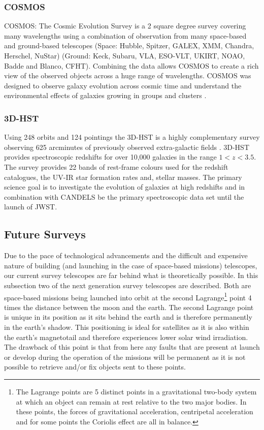 \subsubsection{COSMOS}

COSMOS: The Cosmic Evolution Survey is a 2 square degree survey covering many wavelengths using a combination of observation from many space-based and ground-based telescopes (Space: Hubble, Spitzer, GALEX, XMM, Chandra, Herschel, NuStar) (Ground: Keck, Subaru, VLA, ESO-VLT, UKIRT, NOAO, Badde and Blanco, CFHT). Combining the data allows COSMOS to create a rich view of the observed objects across a huge range of wavelengths. COSMOS was designed to observe galaxy evolution across cosmic time and understand the environmental effects of galaxies growing in groups and clusters \citep{HomeCOSMOS}.

\subsubsection{3D-HST}

Using 248 orbits and 124 pointings the 3D-HST is a highly complementary survey observing 625 arcminutes of previously observed extra-galactic fields \citep{Brammer20123D-HST:Telescope}. 3D-HST provides spectroscopic redshifts for over 10,000 galaxies in the range $1 < z < 3.5$. The survey provides 22 bands of rest-frame colours used for the redshift catalogues, the UV-IR star formation rates and, stellar masses. The primary science goal is to investigate the evolution of galaxies at high redshifts and in combination with CANDELS be the primary spectroscopic data set until the launch of JWST.

\subsection{Future Surveys}

Due to the pace of technological advancements and the difficult and expensive nature of building (and launching in the case of space-based missions) telescopes, our current survey telescopes are far behind what is theoretically possible. In this subsection two of the next generation survey telescopes are described. Both are space-based missions being launched into orbit at the second Lagrange\footnote{The Lagrange points are 5 distinct points in a gravitational two-body system at which an object can remain at rest relative to the two major bodies. In these points, the forces of gravitational acceleration, centripetal acceleration and for some points the Coriolis effect are all in balance.} point 4 times the distance between the moon and the earth. The second Lagrange point is unique in its position as it sits behind the earth and is therefore permanently in the earth's shadow. This positioning is ideal for satellites as it is also within the earth's magnetotail and therefore experiences lower solar wind irradiation. The drawback of this point is that from here any faults that are present at launch or develop during the operation of the missions will be permanent as it is not possible to retrieve and/or fix objects sent to these points.

